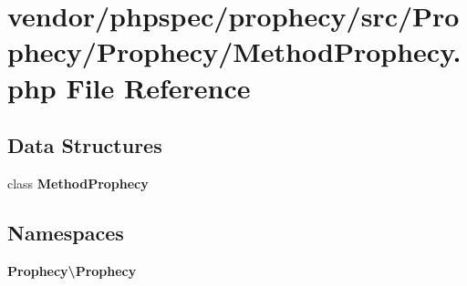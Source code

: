 \section{vendor/phpspec/prophecy/src/\+Prophecy/\+Prophecy/\+Method\+Prophecy.php File Reference}
\label{_method_prophecy_8php}
\subsection*{Data Structures}
\begin{DoxyCompactItemize}
\item 
class {\bf Method\+Prophecy}
\end{DoxyCompactItemize}
\subsection*{Namespaces}
\begin{DoxyCompactItemize}
\item 
 {\bf Prophecy\textbackslash{}\+Prophecy}
\end{DoxyCompactItemize}
